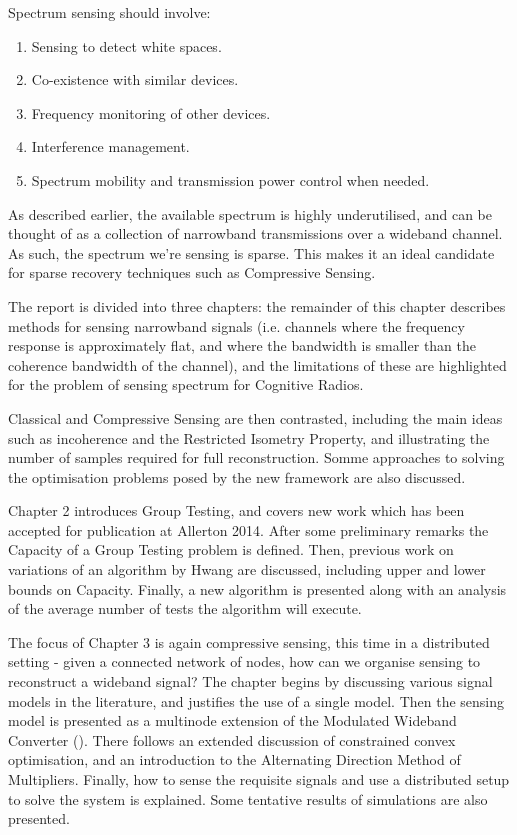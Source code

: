 Spectrum sensing should involve:

\begin{enumerate}
\item Sensing to detect white spaces.
\item Co-existence with similar devices.
\item Frequency monitoring of other devices.
\item Interference management. 
\item Spectrum mobility and transmission power control when needed.
\end{enumerate}

As described earlier, the available spectrum is highly underutilised, and can be thought of as a collection of narrowband transmissions over a wideband channel. As such, the spectrum we're sensing is sparse. This makes it an ideal candidate for sparse recovery techniques such as Compressive Sensing.  

The report is divided into three chapters: the remainder of this chapter describes methods for sensing narrowband signals (i.e. channels where the frequency response is approximately flat, and where the bandwidth is smaller than the coherence bandwidth of the channel), and the limitations of these are highlighted for the problem of sensing spectrum for Cognitive Radios. 

Classical and Compressive Sensing are then contrasted, including the main ideas such as incoherence and the Restricted Isometry Property, and illustrating the number of samples required for full reconstruction.   Somme approaches to solving the optimisation problems posed by the new framework are also discussed.

Chapter 2 introduces Group Testing, and covers new work which has been accepted for publication at Allerton 2014. After some preliminary remarks the Capacity of a Group Testing problem is defined. Then, previous work on variations of an algorithm by Hwang are discussed, including upper and lower bounds on Capacity. Finally, a new algorithm is presented along with an analysis of the average number of tests the algorithm will execute.

The focus of Chapter 3 is again compressive sensing, this time in a distributed setting - given a connected network of nodes, how can we organise sensing to reconstruct a wideband signal? The chapter begins by discussing various signal models in the literature, and justifies the use of a single model. Then the sensing model is presented as a multinode extension of the Modulated Wideband Converter (\cite{Mishali2010}). There follows an extended discussion of constrained convex optimisation, and an introduction to the Alternating Direction Method of Multipliers. Finally, how to sense the requisite signals and use a distributed setup to solve the system is explained. Some tentative results of simulations are also presented.

